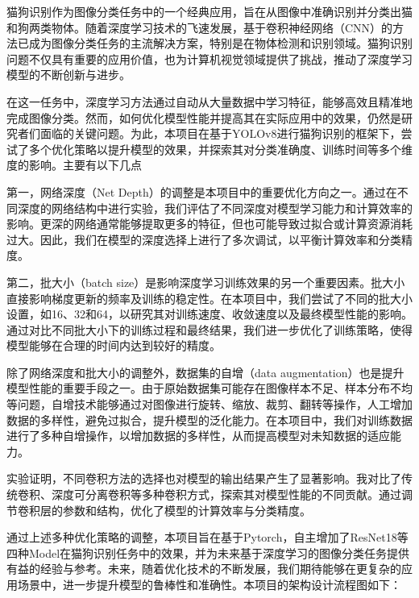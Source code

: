 \documentclass[10.5pt,compsoc]{CjC}
\theoremstyle{mystyle}
\begin{document}
\begin{CJK*}{GBK}{song}
猫狗识别作为图像分类任务中的一个经典应用，旨在从图像中准确识别并分类出猫和狗两类物体。随着深度学习技术的飞速发展，基于卷积神经网络（CNN）的方法已成为图像分类任务的主流解决方案，特别是在物体检测和识别领域。猫狗识别问题不仅具有重要的应用价值，也为计算机视觉领域提供了挑战，推动了深度学习模型的不断创新与进步。
  
在这一任务中，深度学习方法通过自动从大量数据中学习特征，能够高效且精准地完成图像分类。然而，如何优化模型性能并提高其在实际应用中的效果，仍然是研究者们面临的关键问题。为此，本项目在基于YOLOv8进行猫狗识别的框架下，尝试了多个优化策略以提升模型的效果，并探索其对分类准确度、训练时间等多个维度的影响。主要有以下几点

第一，网络深度（Net Depth）的调整是本项目中的重要优化方向之一。通过在不同深度的网络结构中进行实验，我们评估了不同深度对模型学习能力和计算效率的影响。更深的网络通常能够提取更多的特征，但也可能导致过拟合或计算资源消耗过大。因此，我们在模型的深度选择上进行了多次调试，以平衡计算效率和分类精度。

第二，批大小（batch size）是影响深度学习训练效果的另一个重要因素。批大小直接影响梯度更新的频率及训练的稳定性。在本项目中，我们尝试了不同的批大小设置，如16、32和64，以研究其对训练速度、收敛速度以及最终模型性能的影响。通过对比不同批大小下的训练过程和最终结果，我们进一步优化了训练策略，使得模型能够在合理的时间内达到较好的精度。

除了网络深度和批大小的调整外，数据集的自增（data augmentation）也是提升模型性能的重要手段之一。由于原始数据集可能存在图像样本不足、样本分布不均等问题，自增技术能够通过对图像进行旋转、缩放、裁剪、翻转等操作，人工增加数据的多样性，避免过拟合，提升模型的泛化能力。在本项目中，我们对训练数据进行了多种自增操作，以增加数据的多样性，从而提高模型对未知数据的适应能力。

实验证明，不同卷积方法的选择也对模型的输出结果产生了显著影响。我对比了传统卷积、深度可分离卷积等多种卷积方式，探索其对模型性能的不同贡献。通过调节卷积层的参数和结构，优化了模型的计算效率与分类精度。

通过上述多种优化策略的调整，本项目旨在基于Pytorch，自主增加了ResNet18等四种Model在猫狗识别任务中的效果，并为未来基于深度学习的图像分类任务提供有益的经验与参考。未来，随着优化技术的不断发展，我们期待能够在更复杂的应用场景中，进一步提升模型的鲁棒性和准确性。本项目的架构设计流程图如下：


\end{CJK*}
\end{document}
